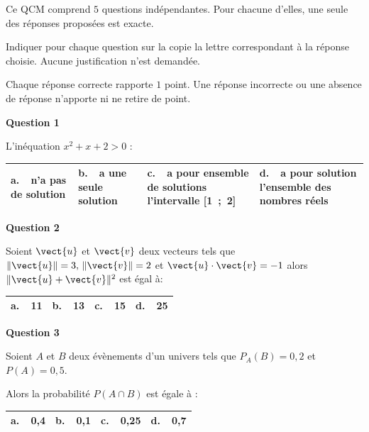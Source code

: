 \medskip

Ce QCM comprend $5$ questions indépendantes. Pour chacune d'elles, une seule des réponses proposées est exacte.

Indiquer pour chaque question sur la copie la lettre correspondant à la réponse choisie. Aucune justification n'est demandée.

Chaque réponse correcte rapporte $1$ point. Une réponse incorrecte ou une absence de réponse n'apporte ni ne retire de point.

\medskip

\textbf{Question 1}

\medskip

L'inéquation $x^2 +x + 2 > 0$ :

\begin{center}
\begin{tabularx}{\linewidth}{|*{4}{X|}}\hline
\textbf{a.~~}n'a pas de solution&\textbf{b.~~}a une seule solution&\textbf{c.~~}a pour ensemble de solutions l'intervalle [1~;~2]&\textbf{d.~~}a pour solution l'ensemble des
 nombres réels\\ \hline
\end{tabularx}
\end{center}

\textbf{Question 2}

\medskip

Soient $\vect{u}$ et $\vect{v}$ deux vecteurs tels que $\|\vect{u}\|= 3,\,\|\vect{v}\|= 2$ et $\vect{u} \cdot \vect{v} = - 1$ alors $\|\vect{u} + \vect{v}\|^2$ est égal à:

\begin{center}
\begin{tabularx}{\linewidth}{|*{4}{X|}}\hline
\textbf{a.~~}11&\textbf{b.~~}13&\textbf{c.~~}15&\textbf{d.~~}25\\ \hline
\end{tabularx}
\end{center}

\textbf{Question 3}

\medskip

Soient $A$ et $B$ deux évènements d'un univers tels que $P_A(B) = 0,2$ et $P(A) = 0,5$.

 Alors la probabilité $P(A \cap B)$ est égale à :
 
\begin{center}
\begin{tabularx}{\linewidth}{|*{4}{X|}}\hline
\textbf{a.~~}0,4&\textbf{b.~~}0,1&\textbf{c.~~}0,25&\textbf{d.~~}0,7\\ \hline
\end{tabularx}
\end{center} 

